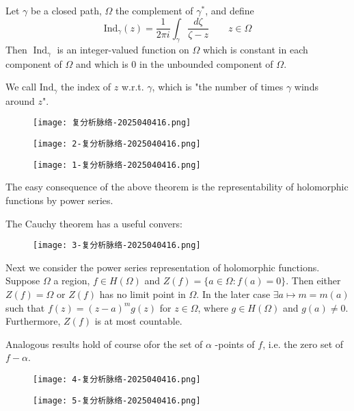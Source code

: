 Let $\gamma$ be a closed path, $\Omega$ the complement of $\gamma^{*}$, and define
\[
\mathrm{Ind}_{\gamma}(z)=\frac{1}{2\pi i}\int_{\gamma}^{} \frac{d\zeta}{\zeta-z} \qquad z\in \Omega
\]
Then $\operatorname{Ind}_\gamma$ is an integer-valued function on $\Omega$ which is constant in each component of $\Omega$ and which is 0 in the unbounded component of $\Omega$.

\begin{note}
We call $\mathrm{Ind}_{\gamma}$ the index of $z$ w.r.t. $\gamma$, which is "the number of times $\gamma$ winds around $z$".
\end{note}
\begin{figure}[H]
\centering
\texttt{[image: 复分析脉络-2025040416.png]}
\label{}
\end{figure}
\begin{figure}[H]
\centering
\texttt{[image: 2-复分析脉络-2025040416.png]}
\label{}
\end{figure}
\begin{figure}[H]
\centering
\texttt{[image: 1-复分析脉络-2025040416.png]}
\label{}
\end{figure}

The easy consequence of the above theorem is the representability of holomorphic functions by power series.

The Cauchy theorem has a useful convers:
\begin{figure}[H]
\centering
\texttt{[image: 3-复分析脉络-2025040416.png]}
\label{}
\end{figure}
Next we consider the power series representation of holomorphic functions. Suppose $\Omega$ a region, $f\in H(\Omega)$ and $Z(f)=\{ a\in \Omega:f(a)=0 \}$. Then either $Z(f)=\Omega$ or $Z(f)$ has no limit point in $\Omega$. In the later case $\exists a\mapsto m=m(a)$ such that $f(z)=(z-a)^{m}g(z)$ for $z\in \Omega$, where $g\in H(\Omega)$ and $g(a)\neq0$. Furthermore, $Z(f)$ is at most countable.

Analogous results hold of course ofor the set of $\alpha$ -points of $f$, i.e. the zero set of $f-\alpha$.

\begin{figure}[H]
\centering
\texttt{[image: 4-复分析脉络-2025040416.png]}
\label{}
\end{figure}

\begin{figure}[H]
\centering
\texttt{[image: 5-复分析脉络-2025040416.png]}
\label{}
\end{figure}


